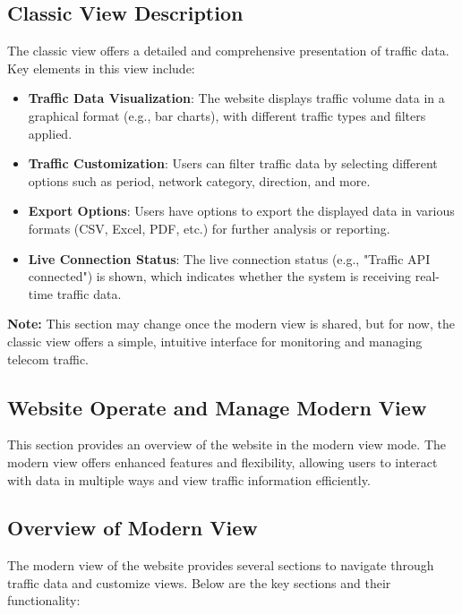 \subsection{Classic View Description}
The classic view offers a detailed and comprehensive presentation of traffic data. Key elements in this view include:
\begin{itemize}
  \item \textbf{Traffic Data Visualization}: The website displays traffic volume data in a graphical format (e.g., bar charts), with different traffic types and filters applied.
  \item \textbf{Traffic Customization}: Users can filter traffic data by selecting different options such as period, network category, direction, and more.
  \item \textbf{Export Options}: Users have options to export the displayed data in various formats (CSV, Excel, PDF, etc.) for further analysis or reporting.
  \item \textbf{Live Connection Status}: The live connection status (e.g., "Traffic API connected") is shown, which indicates whether the system is receiving real-time traffic data.
\end{itemize}
\textbf{Note:} This section may change once the modern view is shared, but for now, the classic view offers a simple, intuitive interface for monitoring and managing telecom traffic.

\subsection{Website Operate and Manage Modern View}
This section provides an overview of the website in the modern view mode. The modern view offers enhanced features and flexibility, allowing users to interact with data in multiple ways and view traffic information efficiently.

\subsection{Overview of Modern View}
The modern view of the website provides several sections to navigate through traffic data and customize views. Below are the key sections and their functionality:

